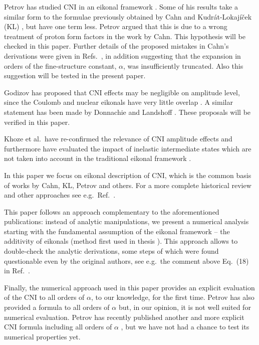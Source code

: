 \documentclass{appolb}
\def\NEW#1{{#1}}
\begin{document}
Petrov has studied CNI in an eikonal framework \cite{petrov2018,petrov2018-erratum}. Some of his results take a similar form to the formulae previously obtained by Cahn \cite{cahn82} and Kudr\'at-Lokaj\'i\v cek (KL) \cite{kl94}, but have one term less. Petrov argued that this is due to a wrong treatment of proton form factors in the work by Cahn. This hypothesis will be checked in this paper. Further details of the proposed mistakes in Cahn's derivations were given in Refs.~\cite{petrov2019,petrov2020}, in addition suggesting that the expansion in orders of the fine-structure constant, $\alpha$, was insufficiently truncated. Also this suggestion will be tested in the present paper.

Godizov has proposed that CNI effects may be negligible on amplitude level, since the Coulomb and nuclear eikonals have very little overlap \cite{godizov2019}. A similar statement has been made by Donnachie and Landshoff \cite{donnachie2019}. These proposals will be verified in this paper.

Khoze et al.~have re-confirmed the relevance of CNI amplitude effects and furthermore have evaluated the impact of inelastic intermediate states which are not taken into account in the traditional eikonal framework \cite{kmr2019}.

In this paper we focus on eikonal description of CNI, which is the common basis of works by Cahn, KL, Petrov and others. For a more complete historical review and other approaches see e.g.~Ref.~\cite{thesis}.

This paper follows an approach complementary to the aforementioned publications: instead of analytic manipulations, we present a numerical analysis starting with the fundamental assumption of the eikonal framework -- the additivity of eikonals (method first used in thesis \cite{thesis}). This approach allows to double-check the analytic derivations, some steps of which were found questionable even by the original authors, see e.g.~the comment above Eq.~(18) in Ref.~\cite{cahn82}.

Finally, the numerical approach used in this paper provides an \NEW{explicit} evaluation of the CNI to all orders of $\alpha$, to our knowledge, for the first time. Petrov has also provided a formula to all orders of $\alpha$ \cite{petrov2018} but\NEW{, in our opinion, it is not well suited for numerical evaluation. Petrov has recently published another and more explicit CNI formula including all orders of $\alpha$ \cite{petrov2020}, but we have not had a chance to test its numerical properties yet.}
\end{document}
